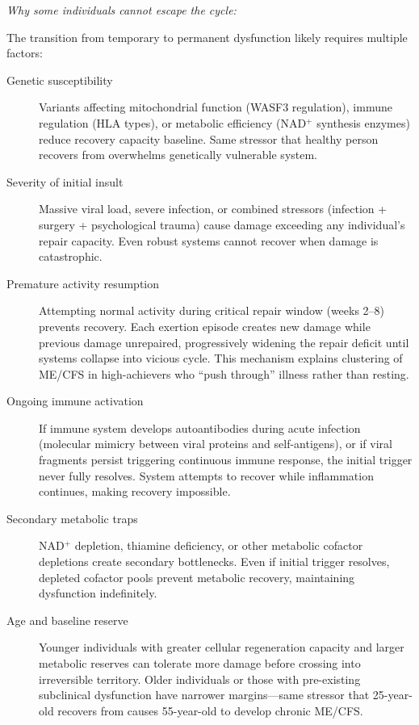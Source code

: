 \textit{Why some individuals cannot escape the cycle:}

The transition from temporary to permanent dysfunction likely requires multiple factors:

\begin{description}
    \item[Genetic susceptibility] Variants affecting mitochondrial function (WASF3 regulation), immune regulation (HLA types), or metabolic efficiency (NAD$^+$ synthesis enzymes) reduce recovery capacity baseline. Same stressor that healthy person recovers from overwhelms genetically vulnerable system.

    \item[Severity of initial insult] Massive viral load, severe infection, or combined stressors (infection + surgery + psychological trauma) cause damage exceeding any individual's repair capacity. Even robust systems cannot recover when damage is catastrophic.

    \item[Premature activity resumption] Attempting normal activity during critical repair window (weeks 2--8) prevents recovery. Each exertion episode creates new damage while previous damage unrepaired, progressively widening the repair deficit until systems collapse into vicious cycle. This mechanism explains clustering of ME/CFS in high-achievers who ``push through'' illness rather than resting.

    \item[Ongoing immune activation] If immune system develops autoantibodies during acute infection (molecular mimicry between viral proteins and self-antigens), or if viral fragments persist triggering continuous immune response, the initial trigger never fully resolves. System attempts to recover while inflammation continues, making recovery impossible.

    \item[Secondary metabolic traps] NAD$^+$ depletion, thiamine deficiency, or other metabolic cofactor depletions create secondary bottlenecks. Even if initial trigger resolves, depleted cofactor pools prevent metabolic recovery, maintaining dysfunction indefinitely.

    \item[Age and baseline reserve] Younger individuals with greater cellular regeneration capacity and larger metabolic reserves can tolerate more damage before crossing into irreversible territory. Older individuals or those with pre-existing subclinical dysfunction have narrower margins---same stressor that 25-year-old recovers from causes 55-year-old to develop chronic ME/CFS.
\end{description}

